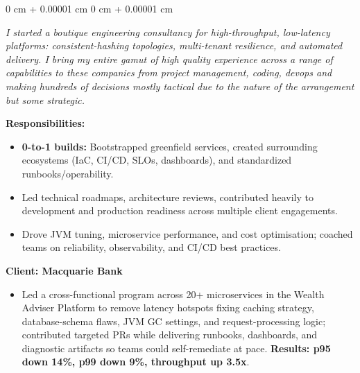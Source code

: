 \documentclass[10pt, letterpaper]{article}
\newenvironment{onecolentry}{
    \begin{adjustwidth}{
        0 cm + 0.00001 cm
    }{
        0 cm + 0.00001 cm
    }
}{
    \end{adjustwidth}
} %
\begin{document}
        \vspace{0.10 cm}
        \begin{onecolentry}
            \begin{adjustwidth}{0.5cm}{0cm}
            \textit{I started a boutique engineering consultancy for high-throughput, low-latency platforms: consistent-hashing topologies, multi-tenant resilience, and automated delivery. I bring my entire gamut of high quality experience across a range of capabilities to these companies from project management, coding, devops and making hundreds of decisions mostly tactical due to the nature of the arrangement but some strategic.}
            \end{adjustwidth}
            
            \vspace{0.10 cm}
            \hspace{0.5cm}\textbf{Responsibilities:}
            \begin{itemize}[
                topsep=0.10 cm,
                parsep=0.10 cm,
                partopsep=0pt,
                itemsep=0pt,
                leftmargin=0 cm + 10pt + 0.5cm
            ]
                \item \textbf{0-to-1 builds:} Bootstrapped greenfield services, created surrounding ecosystems (IaC, CI/CD, SLOs, dashboards), and standardized runbooks/operability.
                \item Led technical roadmaps, architecture reviews, contributed heavily to development and production readiness across multiple client engagements.
                \item Drove JVM tuning, microservice performance, and cost optimisation; coached teams on reliability, observability, and CI/CD best practices.
            \end{itemize}
            
            \vspace{0.10 cm}
            \hspace{0.5cm}\textbf{Client: Macquarie Bank}
            \begin{itemize}[
                topsep=0.10 cm,
                parsep=0.10 cm,
                partopsep=0pt,
                itemsep=0pt,
                leftmargin=0 cm + 10pt + 0.5cm
            ]
                \item Led a cross-functional program across 20+ microservices in the Wealth Adviser Platform to remove latency hotspots fixing caching strategy, database-schema flaws, JVM GC settings, and request-processing logic; contributed targeted PRs while delivering runbooks, dashboards, and diagnostic artifacts so teams could self-remediate at pace. \textbf{Results: p95 down 14\%, p99 down 9\%, throughput up 3.5x}.
            \end{itemize}
            

\end{onecolentry}
\end{document}
